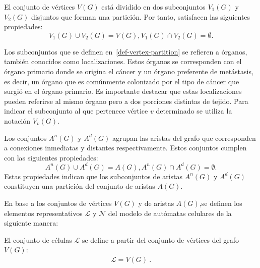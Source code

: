 \begin{definition}
\label{def-vertex-partition}
El conjunto de v\'ertices $V(G)$ est\'a dividido en dos subconjuntos $V_1(G)$ y $V_2(G)$ disjuntos que forman una partici\'on. Por tanto, satisfacen las siguientes propiedades: 
\begin{subequations}
\begin{equation}
V_1(G) \cup V_2(G) = V(G),
\end{equation}
\begin{equation}
V_1(G) \cap V_2(G) = \emptyset.
\end{equation}
\end{subequations}
\end{definition}

Los subconjuntos que se definen en~\ref{def-vertex-partition} se refieren a órganos, también conocidos como localizaciones. Estos órganos se corresponden con el órgano primario donde se origina el cáncer y un órgano preferente de metástasis, es decir, un órgano que es comúnmente colonizado por el tipo de cáncer que surgió en el órgano primario. Es importante destacar que estas localizaciones pueden referirse al mismo órgano pero a dos porciones distintas de tejido. Para indicar el subconjunto al que pertenece v\'ertice $v$ determinado se utiliza la notaci\'on $V_v(G)$.

\begin{definition}
\label{def-edge-partition}
Los conjuntos $A^n(G)$ y $A^d(G)$ agrupan las aristas del grafo que corresponden a conexiones inmediatas y distantes respectivamente. Estos conjuntos cumplen con las siguientes propiedades:
\begin{subequations}
\begin{equation}
A^n(G) \cup A^d(G) = A(G),
\end{equation}
\begin{equation}
A^n(G) \cap A^d(G) = \emptyset.
\end{equation}
\end{subequations}
Estas propiedades indican que los subconjuntos de aristas $A^n(G)$ y $A^d(G)$ constituyen una partición del conjunto de aristas $A(G)$.
\end{definition}

En base a los conjuntos de vértices $V(G)$ y de aristas $A(G)$,se definen los elementos representativos $\mathcal{L}$ y $\mathcal{N}$ del modelo de autómatas celulares de la siguiente manera:

\begin{definition} 
    \label{def-L}
El conjunto de c\'elulas $\mathcal{L}$ se define a partir del conjunto de v\'ertices del grafo  $V(G)$:
\begin{align}
\boxed{\mathcal{L} = V(G)}~. \label{eq-L}
\end{align}
\end{definition}

